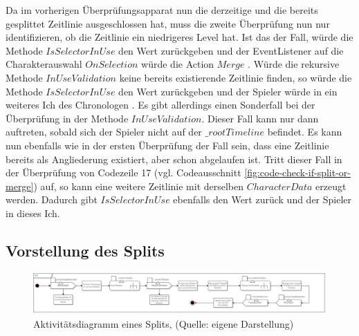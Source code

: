 Da im vorherigen Überprüfungsapparat nun die derzeitige und die bereits gesplittet Zeitlinie ausgeschlossen hat, muss die zweite Überprüfung nun nur identifizieren, ob die Zeitlinie ein niedrigeres Level hat. Ist das der Fall, würde die Methode $IsSelectorInUse$ den Wert  zurückgeben und der EventListener auf die Charakterauswahl $OnSelection$ würde die Action $Merge$ . Würde die rekursive Methode $InUseValidation$ keine bereits existierende Zeitlinie finden, so würde die Methode $IsSelectorInUse$ den Wert  zurückgeben und der Spieler würde in ein weiteres Ich des Chronologen . Es gibt allerdings einen Sonderfall bei der Überprüfung in der Methode $InUseValidation$. Dieser Fall kann nur dann auftreten, sobald sich der Spieler nicht auf der $\_rootTimeline$ befindet. Es kann nun ebenfalls wie in der ersten Überprüfung der Fall sein, dass eine Zeitlinie bereits als Angliederung existiert, aber schon abgelaufen ist. Tritt dieser Fall in der Überprüfung von Codezeile 17 (vgl. Codeausschnitt \ref{fig:code-check-if-split-or-merge}) auf, so kann eine weitere Zeitlinie mit derselben $CharacterData$ erzeugt werden. Dadurch gibt $IsSelectorInUse$ ebenfalls den Wert  zurück und der Spieler  in dieses Ich.

\subsection{Vorstellung des Splits}\label{sec:split_prototype}

\begin{figure}[ht]
\centering
\includegraphics[width=1\linewidth]{content/pictures/Split_uml.jpg}
\caption{Aktivitätsdiagramm eines Splits, (Quelle: eigene Darstellung)}
\label{fig:split-uml}
\end{figure}

